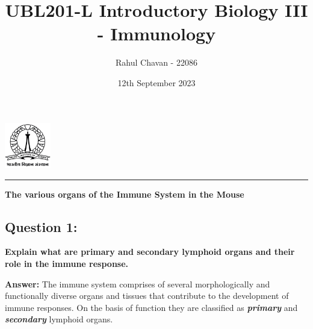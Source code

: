 \documentclass{article}
\title{\textbf{UBL201-L Introductory Biology III - Immunology}}
\author{Rahul Chavan - 22086}
\date{12th September 2023}
\renewcommand{\maketitle}{
 \begin{center}
    \includegraphics[width=2cm]{IISc_Master_Seal_Black.jpg}
    \vspace{0.5cm}

    \Large
    \textbf{\thetitle}
    
    \vspace{0.5cm}
    
    \Large
    \theauthor
    
    \vspace{0.2cm}
    
    \large
    \thedate
\vspace{0.2cm}

    \hrule  
    
    
  
  \end{center}
}
\begin{document}
\maketitle
    \begin{center} \Large
        \textbf{The various organs of the Immune System in the Mouse}
    \end{center} 
\subsection*{Question 1:} \textbf{Explain what are primary and secondary lymphoid organs and their role in the immune response.}

\textbf{Answer:} The immune system comprises of several morphologically and functionally diverse organs and tissues that contribute to the development 
of immune responses.  On the basis of function they are classified as \textbf{\textit{primary}} and \textbf{\textit{secondary}} lymphoid organs.
\end{document}
